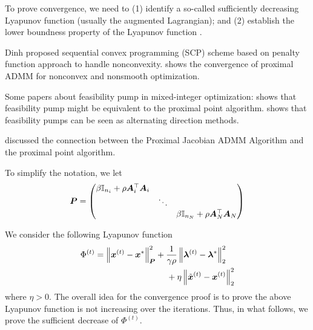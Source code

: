 \documentclass[twocolumn,amsthm]{autart}%
\theoremstyle{definition}
\theoremstyle{plain}
\begin{document}
To prove convergence, we need to (1) identify a so-called sufficiently decreasing Lyapunov function (usually the augmented Lagrangian); and (2) establish the lower boundness property of the Lyapunov function \cite{yang2022proximal}.

Dinh \etal \cite{dinh2013dual} proposed sequential convex programming (SCP) scheme based on penalty function approach to handle nonconvexity.
\cite{yang2022proximal} shows the convergence of proximal ADMM for nonconvex and nonsmooth optimization.

Some papers about feasibility pump in mixed-integer optimization: \cite{boland2012new} shows that feasibility pump might be equivalent to the proximal point algorithm.
\cite{geissler2017penalty} shows that feasibility pumps can be seen as alternating direction methods.

\cite[Section V]{deng2017parallel} discussed the connection between the Proximal Jacobian ADMM Algorithm and the proximal point algorithm.


To simplify the notation, we let
\begin{equation}
\boldsymbol{P} = 
\begin{pmatrix}
\beta \mathbb{I}_{n_i} + \rho \boldsymbol{A}_i^\top \boldsymbol{A}_i \\
& \ddots \\
& & \beta \mathbb{I}_{n_N} + \rho \boldsymbol{A}_N^\top \boldsymbol{A}_N
\end{pmatrix}
\end{equation}

We consider the following Lyapunov function
\begin{equation}
\label{eq:Lya-fcn}
\begin{multlined}
\Phi^{(t)} = \norm{\bbsym{x}^{(t)}-\bbsym{x}^{*}}^2_{\bbsym{P}}
+ \frac{1}{\gamma \rho} \norm{\bbsym{\lambda}^{(t)}-\bbsym{\lambda}^{*}}_2^2 \\
+ \eta \norm{\xtil^{(t)} - \bbsym{x}^{(t)}}_2^2
\end{multlined}
\end{equation}
where $\eta > 0$.
The overall idea for the convergence proof is to prove the above Lyapunov function is not increasing over the iterations.
Thus, in what follows, we prove the sufficient decrease of $\Phi^{(t)}$.
\end{document}
